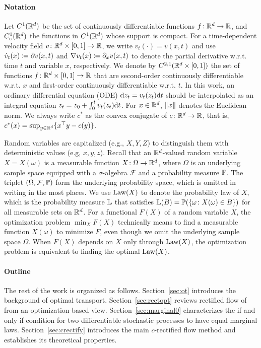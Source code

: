 

\paragraph{Notation} 
Let $C^1(\mathbb{R}^d)$ be the set of continuously  differentiable functions $f\colon \mathbb{R}^d\to \mathbb{R}$, and $C_{\mathrm{c}}^1(\mathbb{R}^d)$ the functions in $C^1(\mathbb{R}^d)$ whose support is compact. 
For a time-dependent velocity field $v \colon \mathbb{R}^d\times[0,1]\to \mathbb{R}$, 
we write $v_t(\cdot) = v(x,t)$ and 
use $\dot v_t(x) \coloneqq \partial v(x,t)$ and $\nabla v_t(x) \coloneqq \partial_x v(x,t)$ to denote the partial derivative w.r.t. time $t$ and variable $x$, respectively. 
We denote by $C^{2,1}(\mathbb{R}^d\times [0,1])$
the set of functions $f\colon \mathbb{R}^d\times [0,1]\to \mathbb{R}$ that are second-order continuously differentiable w.r.t. $x$ and first-order continuously differentiable w.r.t. $t$. 
In this work, 
an ordinary differential equation 
(ODE) $\mathrm{d} z_t = v_t(z_t) \mathrm{d} t$ should be interpolated as an integral equation $z_t = z_0 + \int_0^t v_t(z_t) \mathrm{d}t $. 
For $x\in \mathbb{R}^d$, $\left\lVert x\right\rVert$ denotes the Euclidean norm. We always write $c^*$ as the convex conjugate of $c\colon \mathbb{R}^d\to \mathbb{R}$, that is, $c^*(x) = \sup_{y\in\mathbb{R}^d} \{x^\top y - c(y)\}$. 

Random variables are capitalized (e.g., $X,Y,Z$) to  distinguish them with deterministic values (e.g, $x,y,z$). 
Recall that an $\mathbb{R}^d$-valued random variable  
$X=X(\omega)$ is a measurable function $X\colon \Omega \to \mathbb{R}^d$, where $\Omega$ is an underlying sample space equipped with a $\sigma$-algebra $\mathcal F$ and a probability measure $\mathbb{P}$. 
The triplet $(\Omega, \mathcal F, \mathbb{P})$ form the underlying probability space, which is omitted in writing in the most places.  
We use $\mathrm{Law}(X)$ to denote the probability law of $X$, which is the probability measure $\mathbb{L}$ that satisfies $\mathbb{L}(B) = \mathbb{P}(\{\omega \colon X(\omega) \in B\})$ for all measurable sets on $\mathbb{R}^d$. 
For a functional $F(X)$ of a random variable $X$, 
the optimization problem $\min_{X}F(X)$ %
technically means to 
find a measurable function $X(\omega)$ to minimize $F$, even though we omit the underlying sample space $\Omega$. When $F(X)$ depends on $X$ only through $\mathrm{Law}(X)$, the optimization problem is equivalent to finding the optimal $\mathrm{Law}(X)$. 




\paragraph{Outline} The rest of the work is organized as follows. Section~\ref{sec:ot} 
introduces the background of optimal transport. Section~\ref{sec:rectopt} 
reviews rectified flow of \cite{rectified} from an optimization-based view. 
Section~\ref{sec:marginal0} characterizes 
the if and only if condition 
for two differentiable stochastic processes to have equal marginal laws. 
Section~\ref{sec:crectify} introduces the main $c$-rectified flow method and establishes its theoretical properties. 
 


